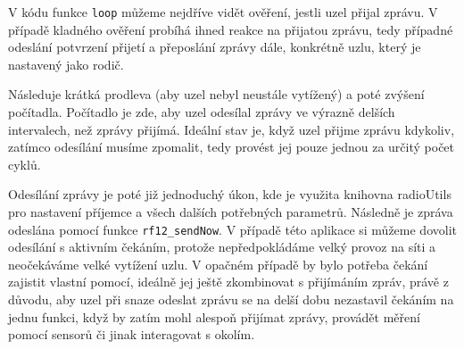 \documentclass[12pt,titlepage]{article}
\begin{document}
V kódu funkce \texttt{loop} můžeme nejdříve vidět ověření, jestli uzel přijal zprávu. V případě kladného ověření probíhá ihned reakce na přijatou zprávu, tedy případné odeslání potvrzení přijetí a přeposlání zprávy dále, konkrétně uzlu, který je nastavený jako rodič.

Následuje krátká prodleva (aby uzel nebyl neustále vytížený) a poté zvýšení počítadla. Počítadlo je zde, aby uzel odesílal zprávy ve výrazně delších intervalech, než zprávy přijímá. Ideální stav je, když uzel přijme zprávu kdykoliv, zatímco odesílání musíme zpomalit, tedy provést jej pouze jednou za určitý počet cyklů.

Odesílání zprávy je poté již jednoduchý úkon, kde je využita knihovna radioUtils pro nastavení příjemce a všech dalších potřebných parametrů. Následně je zpráva odeslána pomocí funkce \texttt{rf12\_sendNow}. V případě této aplikace si můžeme dovolit odesílání s aktivním čekáním, protože nepředpokládáme velký provoz na síti a neočekáváme velké vytížení uzlu. V opačném případě by bylo potřeba čekání zajistit vlastní pomocí, ideálně jej ještě zkombinovat s přijímáním zpráv, právě z důvodu, aby uzel při snaze odeslat zprávu se na delší dobu nezastavil čekáním na jednu funkci, když by zatím mohl alespoň přijímat zprávy, provádět měření pomocí sensorů či jinak interagovat s okolím.
\end{document}
